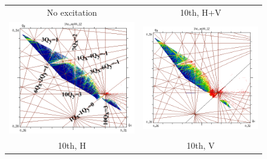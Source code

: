 \documentclass[aps
,prstab
,reprint
,longbibliography
,preprintnumbers
,showkeys
,amsfonts,amssymb,amsmath
,floatfix
]{revtex4-1}
\newlength{\fmawidth}
\newlength{\smallfmawidth}
\begin{document}
\begin{figure}
  \begin{tabular}{cc}
    No excitation & 10th, H+V \\
    \includegraphics[width=\smallfmawidth]{2016injnocolc15o+19_6noerru_dp0_ord10_annotate.png} &
    \includegraphics[width=\smallfmawidth]{2016injnocolc15o+19_6noerrut10skhv_dp0_ord10.png} \\
    10th, H & 10th, V \\

\end{tabular}
\end{figure}
\end{document}
